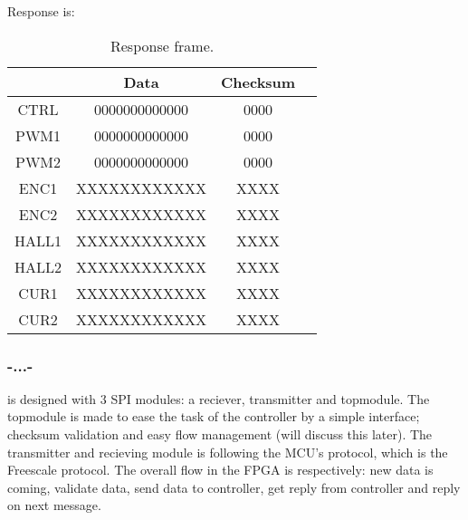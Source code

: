 Response is:

\begin{table}[h!]
\centering
\begin{tabular}{cccc}
\hline
\multicolumn{1}{|l|}{}       & \multicolumn{1}{c|}{Data}            & \multicolumn{1}{c|}{Checksum} \\ \hline
\multicolumn{1}{|c|}{CTRL}   & \multicolumn{1}{c|}{0000000000000}   & \multicolumn{1}{c|}{0000}     \\ \hline
\multicolumn{1}{|c|}{PWM1}   & \multicolumn{1}{c|}{0000000000000}   & \multicolumn{1}{c|}{0000}     \\ \hline
\multicolumn{1}{|c|}{PWM2}   & \multicolumn{1}{c|}{0000000000000}   & \multicolumn{1}{c|}{0000}     \\ \hline
\multicolumn{1}{|c|}{ENC1}   & \multicolumn{1}{c|}{XXXXXXXXXXXX}    & \multicolumn{1}{c|}{XXXX}     \\ \hline
\multicolumn{1}{|c|}{ENC2}   & \multicolumn{1}{c|}{XXXXXXXXXXXX}    & \multicolumn{1}{c|}{XXXX}     \\ \hline
\multicolumn{1}{|c|}{HALL1}  & \multicolumn{1}{c|}{XXXXXXXXXXXX}    & \multicolumn{1}{c|}{XXXX}     \\ \hline
\multicolumn{1}{|c|}{HALL2}  & \multicolumn{1}{c|}{XXXXXXXXXXXX}    & \multicolumn{1}{c|}{XXXX}     \\ \hline
\multicolumn{1}{|c|}{CUR1}   & \multicolumn{1}{c|}{XXXXXXXXXXXX}    & \multicolumn{1}{c|}{XXXX}     \\ \hline
\multicolumn{1}{|c|}{CUR2}   & \multicolumn{1}{c|}{XXXXXXXXXXXX}    & \multicolumn{1}{c|}{XXXX}     \\ \hline
\end{tabular}
\caption{Response frame.}
\end{table}

\subsubsection{-...-}
is designed with 3 SPI modules: a reciever, transmitter and topmodule. The topmodule is made to ease the task of the controller by a simple interface; checksum validation and easy flow management (will discuss this later). The transmitter and recieving module is following the MCU's protocol, which is the Freescale protocol. The overall flow in the FPGA is respectively: new data is coming, validate data, send data to controller, get reply from controller and reply on next message.

